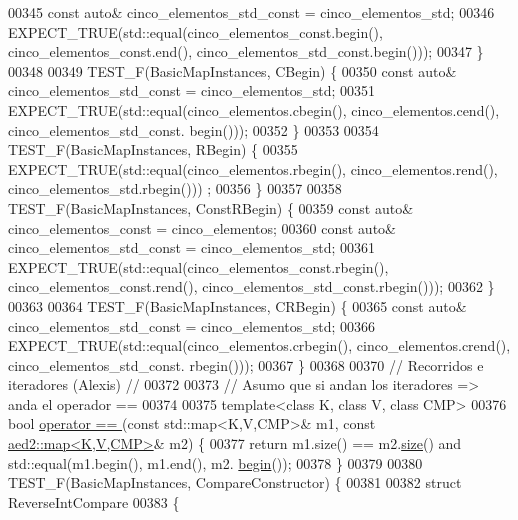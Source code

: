 \begin{DoxyCode}
00345     \textcolor{keyword}{const} \textcolor{keyword}{auto}& cinco\_elementos\_std\_const = cinco\_elementos\_std;
00346     EXPECT\_TRUE(std::equal(cinco\_elementos\_const.begin(), cinco\_elementos\_const.end(), 
      cinco\_elementos\_std\_const.begin()));
00347 \}
00348 
00349 TEST\_F(BasicMapInstances, CBegin) \{
00350     \textcolor{keyword}{const} \textcolor{keyword}{auto}& cinco\_elementos\_std\_const = cinco\_elementos\_std;
00351     EXPECT\_TRUE(std::equal(cinco\_elementos.cbegin(), cinco\_elementos.cend(), cinco\_elementos\_std\_const.
      begin()));
00352 \}
00353 
00354 TEST\_F(BasicMapInstances, RBegin) \{
00355     EXPECT\_TRUE(std::equal(cinco\_elementos.rbegin(), cinco\_elementos.rend(), cinco\_elementos\_std.rbegin()))
      ;
00356 \}
00357 
00358 TEST\_F(BasicMapInstances, ConstRBegin) \{
00359     \textcolor{keyword}{const} \textcolor{keyword}{auto}& cinco\_elementos\_const = cinco\_elementos;
00360     \textcolor{keyword}{const} \textcolor{keyword}{auto}& cinco\_elementos\_std\_const = cinco\_elementos\_std;
00361     EXPECT\_TRUE(std::equal(cinco\_elementos\_const.rbegin(), cinco\_elementos\_const.rend(), 
      cinco\_elementos\_std\_const.rbegin()));
00362 \}
00363 
00364 TEST\_F(BasicMapInstances, CRBegin) \{
00365     \textcolor{keyword}{const} \textcolor{keyword}{auto}& cinco\_elementos\_std\_const = cinco\_elementos\_std;
00366     EXPECT\_TRUE(std::equal(cinco\_elementos.crbegin(), cinco\_elementos.crend(), cinco\_elementos\_std\_const.
      rbegin()));
00367 \}
00368 
00370 \textcolor{comment}{// Recorridos e iteradores (Alexis) //}
00372 \textcolor{comment}{}
00373 \textcolor{comment}{// Asumo que si andan los iteradores => anda el operador ==}
00374 
00375 \textcolor{keyword}{template}<\textcolor{keyword}{class} K, \textcolor{keyword}{class} V, \textcolor{keyword}{class} CMP>
00376 \textcolor{keywordtype}{bool} \hyperlink{classaed2_1_1map_abfc51b39670220e79037ac067006e933_abfc51b39670220e79037ac067006e933}{operator == }(\textcolor{keyword}{const} std::map<K,V,CMP>& m1, \textcolor{keyword}{const} 
      \hyperlink{classaed2_1_1map}{aed2::map<K,V,CMP>}& m2) \{
00377     \textcolor{keywordflow}{return} m1.size() == m2.\hyperlink{classaed2_1_1map_aa6e806b3be6dc0da79adbfae08b571bf_aa6e806b3be6dc0da79adbfae08b571bf}{size}() and std::equal(m1.begin(), m1.end(), m2.
      \hyperlink{classaed2_1_1map_a58a95705d54b3dda7f775ce5a22225cb_a58a95705d54b3dda7f775ce5a22225cb}{begin}());
00378 \}
00379 
00380 TEST\_F(BasicMapInstances, CompareConstructor) \{
00381 
00382     \textcolor{keyword}{struct }ReverseIntCompare
00383     \{

\end{DoxyCode}

